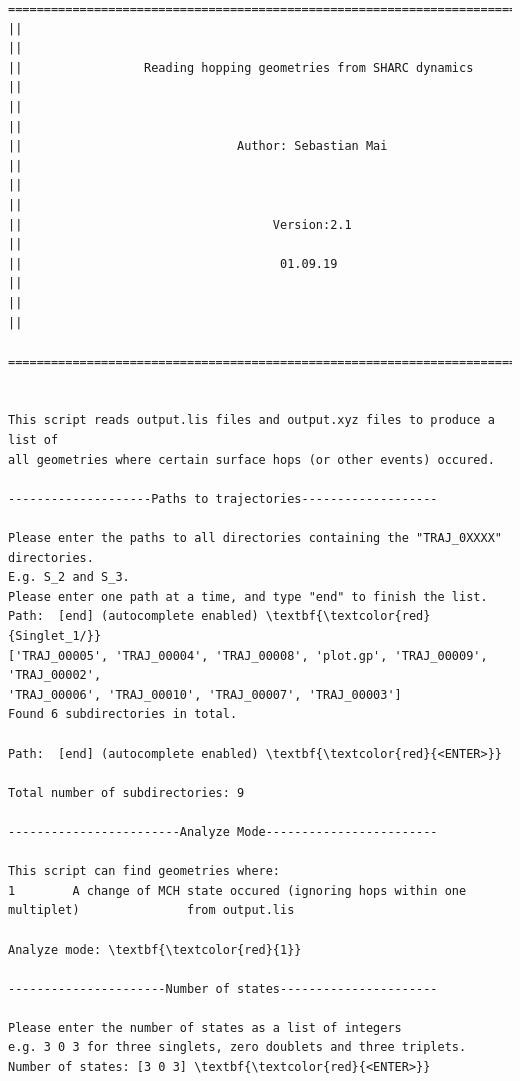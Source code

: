 \documentclass[a4paper,11pt,DIV=15,openany]{scrbook}
\begin{document}
\begin{oframed}
\footnotesize\begin{Verbatim}[commandchars=\\\{\}]
  ================================================================================
||                                                                                ||
||                 Reading hopping geometries from SHARC dynamics                 ||
||                                                                                ||
||                              Author: Sebastian Mai                             ||
||                                                                                ||
||                                   Version:2.1                                  ||
||                                    01.09.19                                    ||
||                                                                                ||
  ================================================================================


This script reads output.lis files and output.xyz files to produce a list of
all geometries where certain surface hops (or other events) occured.

--------------------Paths to trajectories-------------------

Please enter the paths to all directories containing the "TRAJ_0XXXX" directories.
E.g. S_2 and S_3.
Please enter one path at a time, and type "end" to finish the list.
Path:  [end] (autocomplete enabled) \textbf{\textcolor{red}{Singlet_1/}}
['TRAJ_00005', 'TRAJ_00004', 'TRAJ_00008', 'plot.gp', 'TRAJ_00009', 'TRAJ_00002', 
'TRAJ_00006', 'TRAJ_00010', 'TRAJ_00007', 'TRAJ_00003']
Found 6 subdirectories in total.

Path:  [end] (autocomplete enabled) \textbf{\textcolor{red}{<ENTER>}}

Total number of subdirectories: 9

------------------------Analyze Mode------------------------

This script can find geometries where:
1        A change of MCH state occured (ignoring hops within one multiplet)               from output.lis

Analyze mode: \textbf{\textcolor{red}{1}}

----------------------Number of states----------------------

Please enter the number of states as a list of integers
e.g. 3 0 3 for three singlets, zero doublets and three triplets.
Number of states: [3 0 3] \textbf{\textcolor{red}{<ENTER>}}



\end{Verbatim}
\end{oframed}
\end{document}
